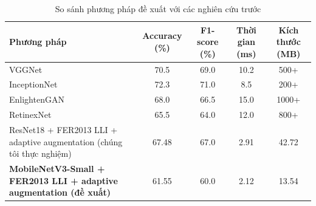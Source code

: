\begin{table}[H]
\centering
\caption{So sánh phương pháp đề xuất với các nghiên cứu trước}
\label{tab:compare_sota}
\begin{tabular}{@{}>{\raggedright\arraybackslash}p{5cm}cccc@{}}
\toprule
\textbf{Phương pháp} & \textbf{Accuracy (\%)} & \textbf{F1-score (\%)} & \textbf{Thời gian (ms)} & \textbf{Kích thước (MB)} \\ \midrule
VGGNet~\cite{goodfellow2014} & 70.5 & 69.0 & 10.2 & 500+ \\
InceptionNet~\cite{goodfellow2014} & 72.3 & 71.0 & 8.5 & 200+ \\
EnlightenGAN~\cite{zhang2021} & 68.0 & 66.5 & 15.0 & 1000+ \\
RetinexNet~\cite{wang2022} & 65.5 & 64.0 & 12.0 & 800+ \\
ResNet18 + FER2013 LLI + adaptive augmentation (chúng tôi thực nghiệm) & 67.48 & 67.0 & 2.91 & 42.72 \\
\textbf{MobileNetV3-Small + FER2013 LLI + adaptive augmentation (đề xuất)} & 61.55 & 60.0 & 2.12 & 13.54 \\ \bottomrule
\end{tabular}
\end{table}

